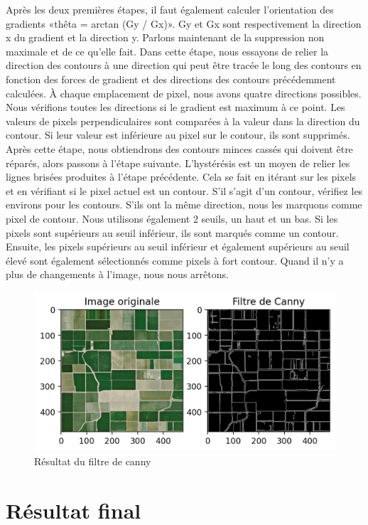 \documentclass[12pt, openany]{report}
\begin{document}
Après les deux premières étapes, il faut également calculer l'orientation des gradients «thêta = arctan (Gy / Gx)». Gy et Gx sont respectivement la direction x du gradient et la direction y.
Parlons maintenant de la suppression non maximale et de ce qu'elle fait. Dans cette étape, nous essayons de relier la direction des contours à une direction qui peut être tracée le long des contours en fonction des forces de gradient et des directions des contours précédemment calculées. À chaque emplacement de pixel, nous avons quatre directions possibles. Nous vérifions toutes les directions si le gradient est maximum à ce point. Les valeurs de pixels perpendiculaires sont comparées à la valeur dans la direction du contour. Si leur valeur est inférieure au pixel sur le contour, ils sont supprimés. Après cette étape, nous obtiendrons des contours minces cassés qui doivent être réparés, alors passons à l'étape suivante.
L'hystérésis est un moyen de relier les lignes brisées produites à l'étape précédente. Cela se fait en itérant sur les pixels et en vérifiant si le pixel actuel est un contour. S'il s'agit d'un contour, vérifiez les environs pour les contours. S'ils ont la même direction, nous les marquons comme pixel de contour. Nous utilisons également 2 seuils, un haut et un bas. Si les pixels sont supérieurs au seuil inférieur, ils sont marqués comme un contour. Ensuite, les pixels supérieurs au seuil inférieur et également supérieurs au seuil élevé sont également sélectionnés comme pixels à fort contour. Quand il n'y a plus de changements à l'image, nous nous arrêtons.

\begin{figure}[H]
\centering
\includegraphics[scale=1.2]{canny_filter.png}
\caption{Résultat du filtre de canny}
\end{figure}

\section{Résultat final}
\end{document}
